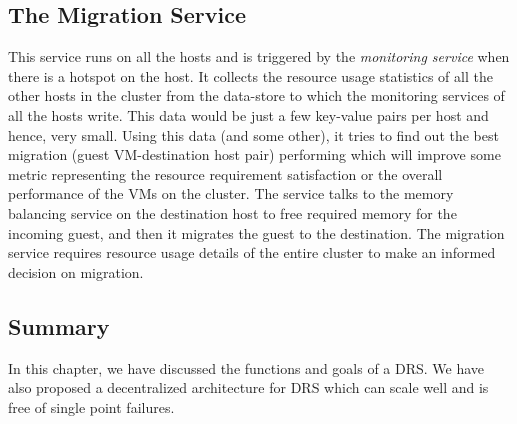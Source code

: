 \subsection{The Migration Service}
This service runs on all the hosts and is triggered by the \textit{monitoring service} when there is a hotspot on the host. It collects the resource usage statistics of all the other hosts in the cluster from the data-store to which the monitoring services of all the hosts write. This data would be just a few key-value pairs per host and hence, very small. Using this data (and some other), it tries to find out the best migration (guest VM-destination host pair) performing which will improve some metric representing the resource requirement satisfaction or the overall performance of the VMs on the cluster. The service talks to the memory balancing service on the destination host to free required memory for the incoming guest, and then it migrates the guest to the destination. The migration service requires resource usage details of the entire cluster to make an informed decision on migration.

\subsection*{Summary}
In this chapter, we have discussed the functions and goals of a DRS. We have also proposed a decentralized architecture for DRS which can scale well and is free of single point failures.